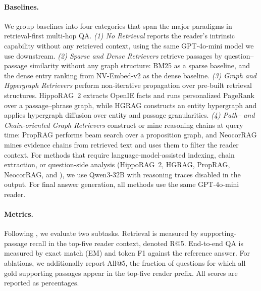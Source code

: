 \paragraph{Baselines.}
We group baselines into four categories that span the major paradigms
in retrieval-first multi-hop QA. \emph{(1) No Retrieval} reports the
reader's intrinsic capability without any retrieved context, using the
same GPT-4o-mini model we use downstream. \emph{(2) Sparse and Dense
Retrievers} retrieve passages by question--passage similarity without
any graph structure: BM25 \citep{robertson2009bm25} as a sparse
baseline, and the dense entry ranking from
NV-Embed-v2 \citep{lee2025nvembed} as the dense
baseline. \emph{(3) Graph and Hypergraph Retrievers} perform
non-iterative propagation over pre-built retrieval structures.
HippoRAG~2 \citep{gutierrez2025hipporag} extracts OpenIE facts and runs
personalized PageRank over a passage--phrase graph, while HGRAG
\citep{hgrag2024} constructs an entity hypergraph and applies
hypergraph diffusion over entity and passage granularities. \emph{(4) Path-- and
Chain-oriented Graph Retrievers} construct or mine reasoning chains at
query time: PropRAG \citep{wang2025proprag} performs beam search over a
proposition graph, and NeocorRAG \citep{peng2026neocorrag} mines
evidence chains from retrieved text and uses them to filter the reader
context. For methods that require language-model-assisted indexing,
chain extraction, or question-side analysis (HippoRAG~2, HGRAG,
PropRAG, NeocorRAG, and \methodname{}), we use Qwen3-32B with reasoning
traces disabled in the output. For final answer generation, all
methods use the same GPT-4o-mini reader.

\paragraph{Metrics.}
Following \citet{gutierrez2025hipporag}, we evaluate two subtasks.
Retrieval is measured by supporting-passage recall in the top-five
reader context, denoted R@5. End-to-end QA is measured by exact match
(EM) and token F1 against the reference answer. For ablations, we
additionally report All@5, the fraction of questions for which all
gold supporting passages appear in the top-five reader prefix. All
scores are reported as percentages.

